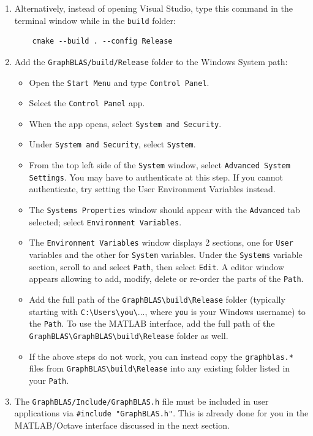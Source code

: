\begin{enumerate}
\item Alternatively, instead of opening Visual Studio,
    type this command in the terminal window while in the \verb'build' folder:
    {\small
    \begin{verbatim}
    cmake --build . --config Release
    \end{verbatim}}

\item Add the \verb'GraphBLAS/build/Release' folder to the Windows System path:

    \begin{itemize}
    \item Open the \verb'Start Menu' and type \verb'Control Panel'.
    \item Select the \verb'Control Panel' app.
    \item When the app opens, select \verb'System and Security'.
    \item Under \verb'System and Security', select \verb'System'.
    \item From the top left side of the \verb'System' window, select
        \verb'Advanced System Settings'.  You may have to authenticate
        at this step.
        If you cannot authenticate, try setting the User Environment Variables
        instead.
    \item The \verb'Systems Properties' window should appear with the
        \verb'Advanced' tab selected;
        select \verb'Environment Variables'.
    \item The \verb'Environment Variables' window displays 2 sections, one for
        \verb'User' variables and the other for \verb'System' variables.  Under
        the \verb'Systems' variable section, scroll to and select \verb'Path',
        then select \verb'Edit'.   A editor window appears allowing to add,
        modify, delete or re-order the parts of the \verb'Path'.
    \item Add the full path of the \verb'GraphBLAS\build\Release' folder
        (typically starting with \verb'C:\Users\you\'..., where \verb'you' is
        your Windows username) to the \verb'Path'.
        To use the MATLAB interface, add
        the full path of the \verb'GraphBLAS\GraphBLAS\build\Release' folder
        as well.
    \item If the above steps do not work, you can instead copy the
        \verb'graphblas.*' files from \verb'GraphBLAS\build\Release' into any
        existing folder listed in your \verb'Path'.
    \end{itemize}

\item The \verb'GraphBLAS/Include/GraphBLAS.h' file must be included in user
    applications via \verb'#include "GraphBLAS.h"'.  This is already done for
    you in the MATLAB/Octave interface discussed in the next section.

\end{enumerate}

